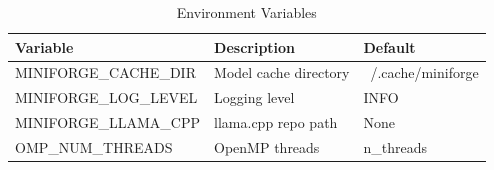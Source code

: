 \begin{table}[h]
\centering
\caption{Environment Variables}
\label{tab:env_vars}
\begin{tabular}{lll}
\toprule
\textbf{Variable} & \textbf{Description} & \textbf{Default} \\
\midrule
MINIFORGE\_CACHE\_DIR & Model cache directory & ~/.cache/miniforge \\
MINIFORGE\_LOG\_LEVEL & Logging level & INFO \\
MINIFORGE\_LLAMA\_CPP & llama.cpp repo path & None \\
OMP\_NUM\_THREADS & OpenMP threads & n\_threads \\
\bottomrule
\end{tabular}
\end{table}
